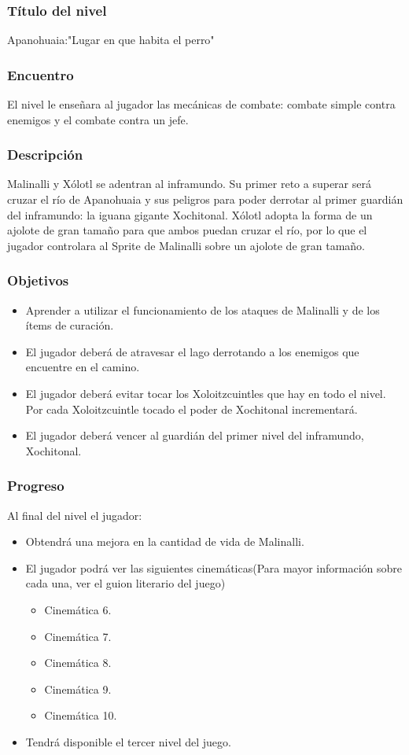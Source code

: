 \documentclass[11pt,letterpaper]{article}
\begin{document}
	\subsubsection{Título del nivel}
	Apanohuaia:"Lugar en que habita el perro"
	\subsubsection{Encuentro}
El nivel le enseñara al jugador las mecánicas de combate: combate simple contra enemigos y el combate contra un jefe. 
	\subsubsection{Descripción}
Malinalli y Xólotl se adentran al inframundo. Su primer reto a superar será cruzar el río de Apanohuaia y sus peligros para poder derrotar al primer guardián del inframundo: la iguana gigante Xochitonal. Xólotl adopta la forma de un ajolote de gran tamaño para que ambos puedan cruzar el río, por lo que el jugador controlara al Sprite de Malinalli sobre un ajolote de gran tamaño. 
	\subsubsection{Objetivos}
\begin{itemize}
	\item Aprender a utilizar el funcionamiento de los ataques de Malinalli y de los ítems de curación.
	\item El jugador deberá de atravesar el lago derrotando a los enemigos que encuentre en el camino.
	\item El jugador deberá evitar tocar los Xoloitzcuintles que hay en todo el nivel. Por cada Xoloitzcuintle tocado el poder de Xochitonal incrementará.
	\item El jugador deberá vencer al guardián del primer nivel del inframundo, Xochitonal.
\end{itemize}
	\subsubsection{Progreso}
Al final del nivel el jugador:
\begin{itemize}
	\item Obtendrá una mejora en la cantidad de vida de Malinalli.
	\item El jugador podrá ver las siguientes cinemáticas(Para mayor información sobre cada una, ver el guion literario del juego)
		\begin{itemize}
			\item Cinemática 6.
			\item Cinemática 7.
			\item Cinemática 8.
			\item Cinemática 9.
			\item Cinemática 10.
		\end{itemize}
	\item Tendrá disponible el tercer nivel del juego. 
\end{itemize}
\end{document}
